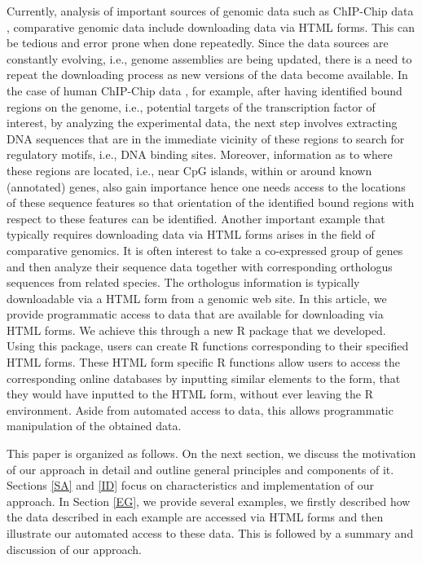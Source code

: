 \documentclass[notitlepage,11pt]{article}
\begin{document}
Currently, analysis of important sources of genomic data such as ChIP-Chip data \citep{Cawley04, Keles04.2}, 
comparative genomic data include
downloading data via HTML forms. This can be tedious and error prone when done repeatedly. Since the data sources are 
constantly evolving, i.e., genome assemblies are being updated, there is a need to repeat the downloading  
process as new versions of the data become available.  In the case of human ChIP-Chip data \citep{Cawley04, Keles04.2}, for example,  after having 
identified bound regions on the genome, 
i.e., potential targets of the transcription factor of interest, by analyzing the experimental data,  the next step involves 
extracting  
DNA sequences that are in the immediate 
vicinity of  these regions to search for regulatory motifs, i.e., DNA binding sites. Moreover, information as to where these
 regions are  located, i.e., near CpG islands, within or around known (annotated) genes, also gain importance hence one needs  access
to the locations of these sequence features so that orientation of the identified bound regions with respect to  these
 features can be identified.
Another important example that typically requires downloading data via HTML forms arises in the field of comparative genomics. 
It is often interest 
to take a co-expressed group of genes and then analyze their sequence  data together with corresponding orthologus sequences 
from related species. The orthologus information is typically  downloadable via a HTML form from a genomic web site.
In this article, we provide programmatic access to data that are available for downloading  via HTML forms. We achieve this
through a new R package that we developed.  Using this package, users can create R functions corresponding to their specified 
HTML forms. These  HTML form specific R functions allow users to access the corresponding online databases by inputting similar 
elements to the form, that they would have inputted to the HTML form, without ever leaving the R environment.
Aside from automated access to  data, this allows programmatic manipulation of  the obtained data.


This paper is organized as follows. On the next section, we discuss the motivation of our approach in detail and 
outline general principles and components of it. Sections \ref{SA} and \ref{ID} focus on characteristics and 
implementation of our approach. In Section \ref{EG}, we provide several examples, we firstly described how the data described 
in each example  are accessed via HTML forms and then illustrate our automated access to these data. This is followed by 
a summary and discussion of our approach.
\end{document}
